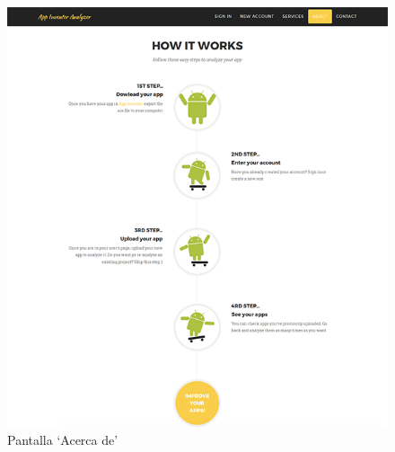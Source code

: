 \documentclass[a4paper, 12pt]{book}
\begin{document}
\begin{figure}[H]
  \centering
  \includegraphics[width=0.60\linewidth, keepaspectratio]{img/About}
  \caption{Pantalla `Acerca de'}
  \label{fig:About}
\end{figure}
\end{document}
